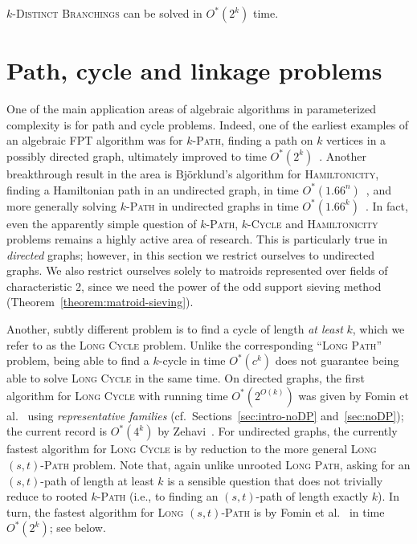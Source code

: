 \documentclass{theoretics}
\begin{document}
\begin{corollary}
  \textsc{$k$-Distinct Branchings} can be solved in $O^*(2^k)$ time.
\end{corollary}

\section{Path, cycle and linkage problems}
\label{sec:paths-linkages}

One of the main application areas of algebraic algorithms in
parameterized complexity is for path and cycle problems. Indeed, one
of the earliest examples of an algebraic FPT algorithm was for
\textsc{$k$-Path}, finding a path on $k$ vertices in a possibly
directed graph, ultimately improved to time $O^*(2^k)$~\cite{Koutis08ICALP,Williams09IPL,KoutisW09limits}.
Another breakthrough result in the area is Björklund's algorithm for
\textsc{Hamiltonicity}, finding a Hamiltonian path in an undirected
graph, in time $O^*(1.66^n)$~\cite{Bjorklund14detsum},
and more generally solving \textsc{$k$-Path} in undirected graphs in
time $O^*(1.66^k)$~\cite{BjorklundHKK17narrow}.
In fact, even the apparently simple question of \textsc{$k$-Path},
\textsc{$k$-Cycle} and \textsc{Hamiltonicity} problems remains a
highly active area of research.
This is particularly true in \emph{directed} graphs; 
however, in this section we restrict ourselves to undirected graphs. 
We also restrict ourselves solely to matroids represented over fields
of characteristic 2, since we need the power of the odd support
sieving method (Theorem~\ref{theorem:matroid-sieving}). 

Another, subtly different problem is to find a cycle of length
\emph{at least} $k$, which we refer to as the \textsc{Long Cycle}
problem. Unlike the corresponding ``\textsc{Long Path}'' problem,
being able to find a $k$-cycle in time $O^*(c^k)$ does not guarantee 
being able to solve \textsc{Long Cycle} in the same time.
On directed graphs, the first algorithm for \textsc{Long Cycle}
with running time $O^*(2^{O(k)})$ was given by Fomin et al.~\cite{FominLPS16JACM}
using \emph{representative families} 
(cf.~Sections~\ref{sec:intro-noDP} and~\ref{sec:noDP});
the current record is $O^*(4^k)$ by Zehavi~\cite{Zehavi16ldc}.
For undirected graphs, the currently fastest algorithm for
\textsc{Long Cycle} is by reduction to the more general
\textsc{Long $(s,t)$-Path} problem. Note that, again unlike unrooted
\textsc{Long Path}, asking for an $(s,t)$-path of length at least $k$
is a sensible question that does not trivially reduce to rooted
\textsc{$k$-Path} (i.e., to finding an $(s,t)$-path of length exactly $k$).
In turn, the fastest algorithm for \textsc{Long $(s,t)$-Path}
is by Fomin et al.~\cite{FominGKSS24} in time $O^*(2^k)$; see below. 
\end{document}
